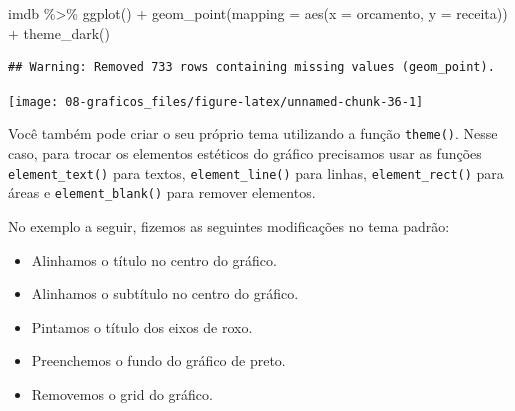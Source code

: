 \documentclass[
]{book}
\newenvironment{Shaded}{\begin{snugshade}}{\end{snugshade}}
\newcommand{\AttributeTok}[1]{\textcolor[rgb]{0.77,0.63,0.00}{#1}}
\newcommand{\FunctionTok}[1]{\textcolor[rgb]{0.00,0.00,0.00}{#1}}
\newcommand{\NormalTok}[1]{#1}
\newcommand{\SpecialCharTok}[1]{\textcolor[rgb]{0.00,0.00,0.00}{#1}}
\providecommand{\tightlist}{%
  \setlength{\itemsep}{0pt}\setlength{\parskip}{0pt}}
\begin{document}
\begin{Shaded}
\begin{Highlighting}[]
\NormalTok{imdb }\SpecialCharTok{\%\textgreater{}\%} 
  \FunctionTok{ggplot}\NormalTok{() }\SpecialCharTok{+}
  \FunctionTok{geom\_point}\NormalTok{(}\AttributeTok{mapping =} \FunctionTok{aes}\NormalTok{(}\AttributeTok{x =}\NormalTok{ orcamento, }\AttributeTok{y =}\NormalTok{ receita)) }\SpecialCharTok{+}
  \FunctionTok{theme\_dark}\NormalTok{()}
\end{Highlighting}
\end{Shaded}

\begin{verbatim}
## Warning: Removed 733 rows containing missing values (geom_point).
\end{verbatim}

\begin{center}\texttt{[image: 08-graficos\_files/figure-latex/unnamed-chunk-36-1]} \end{center}

Você também pode criar o seu próprio tema utilizando a função \texttt{theme()}. Nesse caso, para trocar os elementos estéticos do gráfico precisamos usar as funções \texttt{element\_text()} para textos, \texttt{element\_line()} para linhas, \texttt{element\_rect()} para áreas e \texttt{element\_blank()} para remover elementos.

No exemplo a seguir, fizemos as seguintes modificações no tema padrão:

\begin{itemize}
\tightlist
\item
  Alinhamos o título no centro do gráfico.
\item
  Alinhamos o subtítulo no centro do gráfico.
\item
  Pintamos o título dos eixos de roxo.
\item
  Preenchemos o fundo do gráfico de preto.
\item
  Removemos o grid do gráfico.
\end{itemize}
\end{document}
